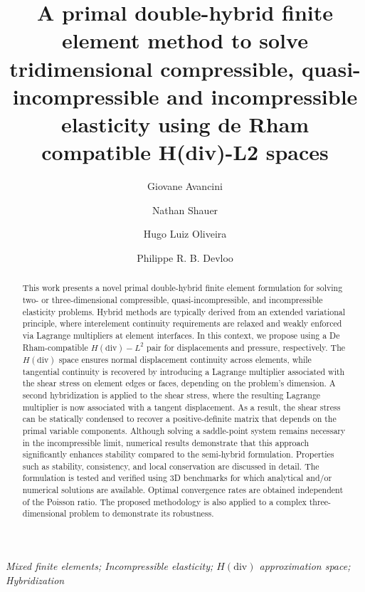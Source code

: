 \documentclass[english,11pt,3p,number,sort&compress]{elsarticle}
\begin{document}
\begin{frontmatter}{}

\title{A primal double-hybrid finite element method to solve tridimensional compressible, quasi-incompressible and incompressible elasticity using de Rham compatible H(div)-L2 spaces}

\author[uni]{Giovane Avancini}


\author[uni]{Nathan Shauer}


\author[uni]{Hugo Luiz Oliveira}


\author[uni]{Philippe R. B. Devloo}


\address[uni]{Universidade Estadual de Campinas, R. Josiah Willard Gibbs 85 - Cidade Universitaria, Campinas SP, Brazil, CEP 13083-839}

\begin{abstract}
	This work presents a novel primal double-hybrid finite element formulation for solving two- or three-dimensional compressible, quasi-incompressible, and incompressible elasticity problems. Hybrid methods are typically derived from an extended variational principle, where interelement continuity requirements are relaxed and weakly enforced via Lagrange multipliers at element interfaces. In this context, we propose using a De Rham-compatible $H(\text{div})-L^2$ pair for displacements and pressure, respectively. The $H(\text{div})$ space ensures normal displacement continuity across elements, while tangential continuity is recovered by introducing a Lagrange multiplier associated with the shear stress on element edges or faces, depending on the problem's dimension. A second hybridization is applied to the shear stress, where the resulting Lagrange multiplier is now associated with a tangent displacement. As a result, the shear stress can be statically condensed to recover a positive-definite matrix that depends on the primal variable components. Although solving a saddle-point system remains necessary in the incompressible limit, numerical results demonstrate that this approach significantly enhances stability compared to the semi-hybrid formulation. Properties such as stability, consistency, and local conservation are discussed in detail. The formulation is tested and verified using 3D benchmarks for which analytical and/or numerical solutions are available. Optimal convergence rates are obtained independent of the Poisson ratio. The proposed methodology is also applied to a complex three-dimensional problem to demonstrate its robustness.
\end{abstract}
\begin{keyword}
\textit{Mixed finite elements; Incompressible elasticity; $H\mathrm{(div)}$ approximation space; Hybridization}
\end{keyword}

\end{frontmatter}{}
\end{document}
